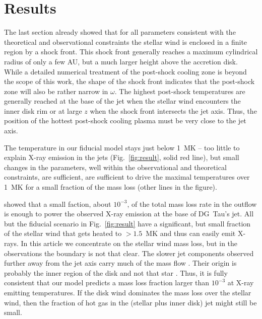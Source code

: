 \section{Results}
\label{sect:results}
The last section already showed that for all parameters consistent with the theoretical and observational constraints the stellar wind is enclosed in a finite region by a shock front. This shock front generally reaches a maximum cylindrical radius of only a few AU, but a much larger height above the accretion disk. While a detailed numerical treatment of the post-shock cooling zone is beyond the scope of this work, the shape of the shock front indicates that the post-shock zone will also be rather narrow in $\omega$. The highest post-shock temperatures are generally reached at the base of the jet when the stellar wind encounters the inner disk rim or at large $z$ when the shock front intersects the jet axis. Thus, the position of the hottest post-shock cooling plasma must be very close to the jet axis. 

The temperature in our fiducial model stays just below 1~MK -- too little to explain X-ray emission in the jets (Fig.~\ref{fig:result}, solid red line), but small changes in the parameters, well within the observational and theoretical constraints,  are sufficient, are sufficient to drive the maximal temperatures over 1~MK for a small fraction of the mass loss (other lines in the figure). 

\citet{2009A&amp;A...493..579G} showed that a small faction, about $10^{-3}$, of the total mass loss rate in the outflow is enough to power the observed X-ray emission at the base of DG~Tau's jet. All but the fiducial scenario in Fig.~\ref{fig:result} have a significant, but small fraction of the stellar wind that gets heated to $>1.5$~MK and thus can easily emit X-rays. In this article we concentrate on the stellar wind mass loss, but in the observations the boundary is not that clear. The slower jet components observed further away from the jet axis carry much of the mass flow \citep{2000ApJ...537L..49B}. Their origin is probably the inner region of the disk and not that star \citep{2003ApJ...590L.107A}. Thus, it is fully consistent that our model predicts a mass loss fraction larger than  $10^{-3}$ at X-ray emitting temperatures. If the disk wind dominates the mass loss over the stellar wind, then the fraction of hot gas in the (stellar plus inner disk) jet might still be small.